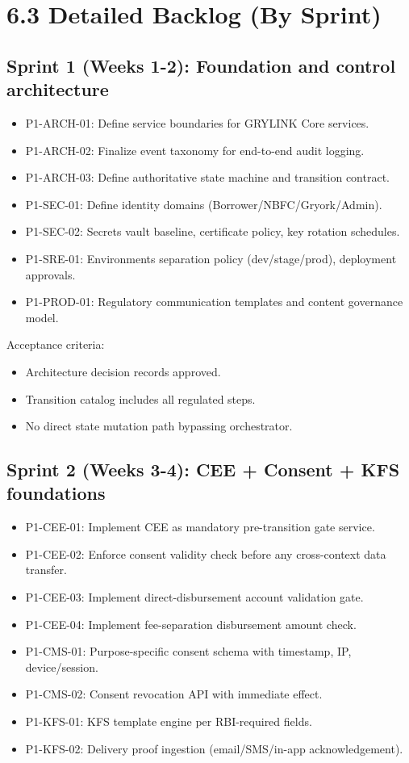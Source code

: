 ﻿\documentclass[12pt]{article}
\begin{document}
\section{6.3 Detailed Backlog (By Sprint)}


\subsection{Sprint 1 (Weeks 1-2): Foundation and control architecture}


\begin{itemize}
\item P1-ARCH-01: Define service boundaries for GRYLINK Core services.
\item P1-ARCH-02: Finalize event taxonomy for end-to-end audit logging.
\item P1-ARCH-03: Define authoritative state machine and transition contract.
\item P1-SEC-01: Define identity domains (Borrower/NBFC/Gryork/Admin).
\item P1-SEC-02: Secrets vault baseline, certificate policy, key rotation schedules.
\item P1-SRE-01: Environments separation policy (dev/stage/prod), deployment approvals.
\item P1-PROD-01: Regulatory communication templates and content governance model.
\end{itemize}

Acceptance criteria:

\begin{itemize}
\item Architecture decision records approved.
\item Transition catalog includes all regulated steps.
\item No direct state mutation path bypassing orchestrator.
\end{itemize}

\subsection{Sprint 2 (Weeks 3-4): CEE + Consent + KFS foundations}


\begin{itemize}
\item P1-CEE-01: Implement CEE as mandatory pre-transition gate service.
\item P1-CEE-02: Enforce consent validity check before any cross-context data transfer.
\item P1-CEE-03: Implement direct-disbursement account validation gate.
\item P1-CEE-04: Implement fee-separation disbursement amount check.
\item P1-CMS-01: Purpose-specific consent schema with timestamp, IP, device/session.
\item P1-CMS-02: Consent revocation API with immediate effect.
\item P1-KFS-01: KFS template engine per RBI-required fields.
\item P1-KFS-02: Delivery proof ingestion (email/SMS/in-app acknowledgement).
\end{itemize}
\end{document}
